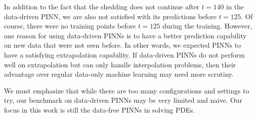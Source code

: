 In addition to the fact that the shedding does not continue after $t=140$ in the data-driven PINN, we are also not satisfied with its predictions before $t=125$.
Of course, there were no training points before $t=125$ during the training.
However, one reason for using data-driven PINNs is to have a better prediction capability on new data that were not seen before.
In other words, we expected PINNs to have a satisfying extrapolation capability.
If data-driven PINNs do not perform well on extrapolation but can only handle interpolation problems, then their advantage over regular data-only machine learning may need more scrutiny.

We must emphasize that while there are too many configurations and settings to try, our benchmark on data-driven PINNs may be very limited and naive.
Our focus in this work is still the data-free PINNs in solving PDEs.
